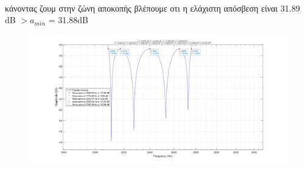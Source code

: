 \documentclass{article}
\begin{document}
{{\begin{figure}[h!]
\end{figure} \\
κάνοντας ζουμ στην ζώνη αποκοπής βλέπουμε οτι η ελάχιστη απόσβεση είναι 31.89 dB $> a_{min}$ = 31.88dB
\begin{figure}[h!]
\centering
 	\advance\leftskip-1cm
  \includegraphics[width=130mm,scale=2]{thema3/matlab8.jpg}
\end{figure}
\clearpage

}}
\end{document}
